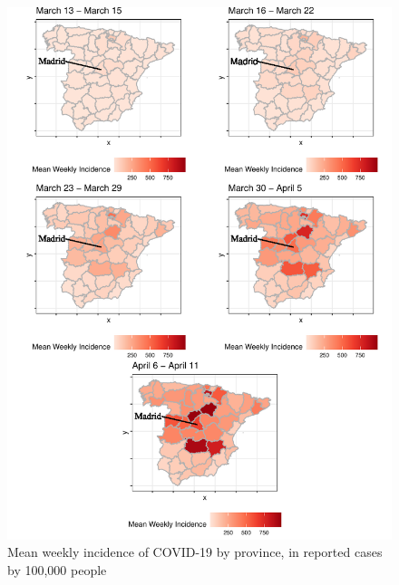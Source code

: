 \documentclass[]{elsarticle} %
\makeatletter
\def\maxwidth{\ifdim\Gin@nat@width>\linewidth\linewidth
\else\Gin@nat@width\fi}
\let\Oldincludegraphics\includegraphics
\renewcommand{\includegraphics}[1]{\Oldincludegraphics[width=\maxwidth]{#1}}
\makeatother
\begin{document}
\begin{figure}
\centering
\includegraphics{Environmental-Correlates-of-COVID19-Spain_files/figure-latex/weekly-average-incidence-map-1.pdf}
\caption{\label{fig:weekly-average-incidence-map}Mean weekly incidence
of COVID-19 by province, in reported cases by 100,000 people}
\end{figure}
\end{document}
